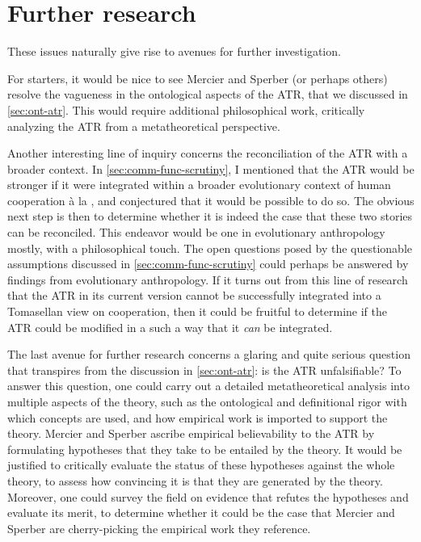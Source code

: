 \section{Further research}

These issues naturally give rise to avenues for further investigation.

For starters, it would be nice to see Mercier and Sperber (or perhaps others) resolve the vagueness in the ontological aspects of the ATR, that we discussed in \cref{sec:ont-atr}. This would require additional philosophical work, critically analyzing the ATR from a metatheoretical perspective.

Another interesting line of inquiry concerns the reconciliation of the ATR with a broader context. In \cref{sec:comm-func-scrutiny}, I mentioned that the ATR would be stronger if it were integrated within a broader evolutionary context of human cooperation à la \citet{Tomasello09}, and conjectured that it would be possible to do so. The obvious next step is then to determine whether it is indeed the case that these two stories can be reconciled. This endeavor would be one in evolutionary anthropology mostly, with a philosophical touch. The open questions posed by the questionable assumptions discussed in \cref{sec:comm-func-scrutiny} could perhaps be answered by findings from evolutionary anthropology.
If it turns out from this line of research that the ATR in its current version cannot be successfully integrated into a Tomasellan view on cooperation, then it could be fruitful to determine if the ATR could be modified in a such a way that it \emph{can} be integrated.

The last avenue for further research concerns a glaring and quite serious question that transpires from the discussion in \cref{sec:ont-atr}: is the ATR unfalsifiable?
To answer this question, one could carry out a detailed metatheoretical analysis into multiple aspects of the theory, such as the ontological and definitional rigor with which concepts are used, and how empirical work is imported to support the theory. Mercier and Sperber ascribe empirical believability to the ATR by formulating hypotheses that they take to be entailed by the theory. It would be justified to critically evaluate the status of these hypotheses against the whole theory, to assess how convincing it is that they are generated by the theory. Moreover, one could survey the field on evidence that refutes the hypotheses and evaluate its merit, to determine whether it could be the case that Mercier and Sperber are cherry-picking the empirical work they reference.

